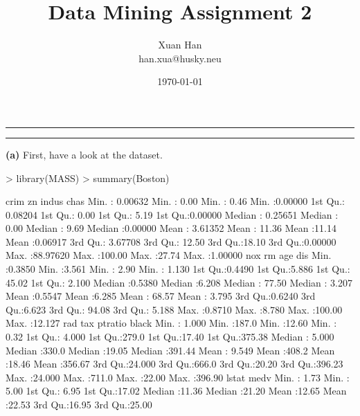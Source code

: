 \documentclass[a4paper]{article}
\makeatletter
\newcommand{\question}[2] {\vspace{.25in} \hrule\vspace{0.5em}
\noindent{\bf #1: #2} \vspace{0.5em}
\hrule \vspace{.10in}}
\renewcommand{\part}[1] {\vspace{.10in} {\bf (#1)}}
\newcommand{\myname}{Xuan Han}
\newcommand{\myhusky}{han.xua@husky.neu}
\newcommand{\myhwnum}{2}
\makeatother
\begin{document}


\title{Data Mining Assignment \myhwnum}
\author{\myname \\
        \myhusky}
\date{\today}
\maketitle

\medskip
\thispagestyle{plain}

\question{10}{Boston data set explore}
\part{a}
First, have a look at the dataset.
\begin{Schunk}
\begin{Sinput}
> library(MASS)
> summary(Boston)
\end{Sinput}
\begin{Soutput}
      crim                zn             indus            chas        
 Min.   : 0.00632   Min.   :  0.00   Min.   : 0.46   Min.   :0.00000  
 1st Qu.: 0.08204   1st Qu.:  0.00   1st Qu.: 5.19   1st Qu.:0.00000  
 Median : 0.25651   Median :  0.00   Median : 9.69   Median :0.00000  
 Mean   : 3.61352   Mean   : 11.36   Mean   :11.14   Mean   :0.06917  
 3rd Qu.: 3.67708   3rd Qu.: 12.50   3rd Qu.:18.10   3rd Qu.:0.00000  
 Max.   :88.97620   Max.   :100.00   Max.   :27.74   Max.   :1.00000  
      nox               rm             age              dis        
 Min.   :0.3850   Min.   :3.561   Min.   :  2.90   Min.   : 1.130  
 1st Qu.:0.4490   1st Qu.:5.886   1st Qu.: 45.02   1st Qu.: 2.100  
 Median :0.5380   Median :6.208   Median : 77.50   Median : 3.207  
 Mean   :0.5547   Mean   :6.285   Mean   : 68.57   Mean   : 3.795  
 3rd Qu.:0.6240   3rd Qu.:6.623   3rd Qu.: 94.08   3rd Qu.: 5.188  
 Max.   :0.8710   Max.   :8.780   Max.   :100.00   Max.   :12.127  
      rad              tax           ptratio          black       
 Min.   : 1.000   Min.   :187.0   Min.   :12.60   Min.   :  0.32  
 1st Qu.: 4.000   1st Qu.:279.0   1st Qu.:17.40   1st Qu.:375.38  
 Median : 5.000   Median :330.0   Median :19.05   Median :391.44  
 Mean   : 9.549   Mean   :408.2   Mean   :18.46   Mean   :356.67  
 3rd Qu.:24.000   3rd Qu.:666.0   3rd Qu.:20.20   3rd Qu.:396.23  
 Max.   :24.000   Max.   :711.0   Max.   :22.00   Max.   :396.90  
     lstat            medv      
 Min.   : 1.73   Min.   : 5.00  
 1st Qu.: 6.95   1st Qu.:17.02  
 Median :11.36   Median :21.20  
 Mean   :12.65   Mean   :22.53  
 3rd Qu.:16.95   3rd Qu.:25.00  

\end{Soutput}
\end{Schunk}
\end{document}
